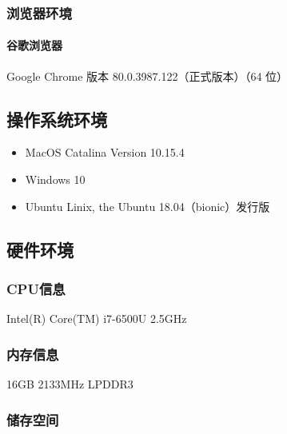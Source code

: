 \documentclass[hyperref, a4paper]{ctexart}
\providecommand{\tightlist}{%
  \setlength{\itemsep}{0pt}\setlength{\parskip}{0pt}}
\let\oldparagraph\paragraph
\renewcommand{\paragraph}[1]{\oldparagraph{#1}\mbox{}}
\begin{document}
\hypertarget{ux6d4fux89c8ux5668ux73afux5883}{%
\subsubsection{浏览器环境}\label{ux6d4fux89c8ux5668ux73afux5883}}

\hypertarget{ux8c37ux6b4cux6d4fux89c8ux5668}{%
\paragraph{谷歌浏览器}\label{ux8c37ux6b4cux6d4fux89c8ux5668}}

Google Chrome 版本 80.0.3987.122（正式版本）（64 位）

\hypertarget{ux64cdux4f5cux7cfbux7edfux73afux5883}{%
\subsection{操作系统环境}\label{ux64cdux4f5cux7cfbux7edfux73afux5883}}

\begin{itemize}
\tightlist
\item
  MacOS Catalina Version 10.15.4
\item
  Windows 10
\item
  Ubuntu Linix, the Ubuntu 18.04（bionic）发行版
\end{itemize}

\hypertarget{ux786cux4ef6ux73afux5883}{%
\subsection{硬件环境}\label{ux786cux4ef6ux73afux5883}}

\hypertarget{cpuux4fe1ux606f}{%
\subsubsection{CPU信息}\label{cpuux4fe1ux606f}}

Intel(R) Core(TM) i7-6500U 2.5GHz

\hypertarget{ux5185ux5b58ux4fe1ux606f}{%
\subsubsection{内存信息}\label{ux5185ux5b58ux4fe1ux606f}}

16GB 2133MHz LPDDR3

\hypertarget{ux50a8ux5b58ux7a7aux95f4}{%
\subsubsection{储存空间}\label{ux50a8ux5b58ux7a7aux95f4}}
\end{document}
